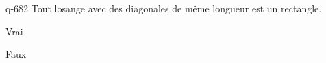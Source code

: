 \begin{truefalse}{q-682}
Tout losange avec des diagonales de même longueur est un rectangle.
\item* Vrai
\item Faux
\end{truefalse}

